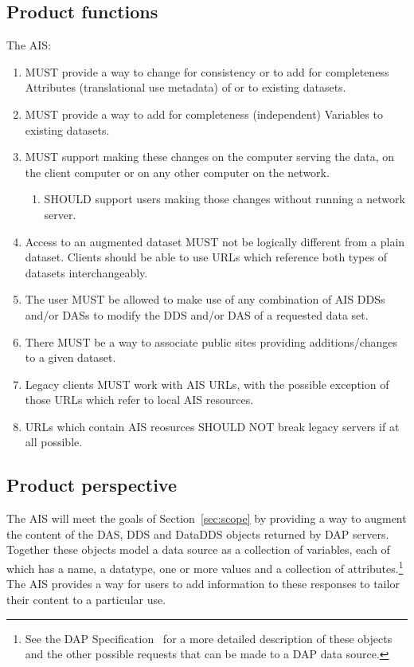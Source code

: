 \documentclass{article}
\begin{document}
\cbstart
\subsection{Product functions}
The \ac{AIS}:
\begin{enumerate}
\item MUST provide a way to change for consistency or to add
   for completeness Attributes (translational use metadata)
   of or to existing datasets.

\item MUST provide a way to add for completeness (independent)
   Variables to existing datasets. 

\item MUST support making these changes on the computer serving
   the data, on the client computer or on any other computer 
   on the network.

\begin{enumerate}
\item SHOULD support users making those changes without running 
   a network server.
\end{enumerate}

\item Access to an augmented dataset MUST not be logically different 
   from a plain dataset. Clients should be able to use URLs which 
   reference both types of datasets interchangeably.

\item The user MUST be allowed to make use of any combination of 
   AIS DDSs and/or DASs to modify the DDS and/or DAS of a 
   requested data set.

\item There MUST be a way to associate public sites providing 
   additions/changes to a given dataset. 

\item Legacy clients MUST work with AIS URLs, with the possible exception of
  those URLs which refer to local AIS resources.

\item URLs which contain AIS reosurces SHOULD NOT break legacy servers if at
  all possible.

\end{enumerate}
\cbend

\subsection{Product perspective}

\cbstart
The \acl{AIS} will meet the goals of Section~\ref{sec:scope} by providing a
way to augment the content of the \ac{DAS}, \ac{DDS} and \ac{DataDDS} objects
returned by \ac{DAP} servers. Together these objects model a data source as a
collection of variables, each of which has a name, a datatype, one or more
values and a collection of attributes.\footnote{See the DAP
  Specification~\cite{gallagher:dap-spec} for a more detailed description of
  these objects and the other possible requests that can be made to a DAP
  data source.} The \ac{AIS} provides a way for users to add information to
these responses to tailor their content to a particular use.
\cbend
\end{document}
